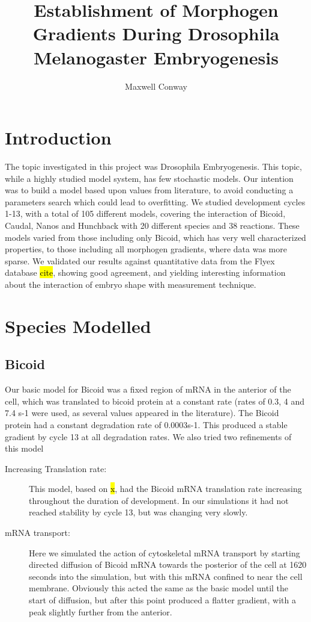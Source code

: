 \documentclass[11pt,a4paper,twocolumn]{article}
\begin{document}
\title{Establishment of Morphogen Gradients During Drosophila Melanogaster Embryogenesis}
\author{Maxwell Conway}
\date{}
\maketitle
\section{Introduction}
The topic investigated in this project was Drosophila Embryogenesis. This topic, while a highly studied model system, has few stochastic models. Our intention was to build a model based upon values from literature, to avoid conducting a parameters search which could lead to overfitting. We studied development cycles 1-13, with a total of 105 different models, covering the interaction of Bicoid, Caudal, Nanos and Hunchback with 20 different species and 38 reactions. These models varied from those including only Bicoid, which has very well characterized properties, to those including all morphogen gradients, where data was more sparse. We validated our results against quantitative data from the Flyex database \hl{cite}, showing good agreement, and yielding interesting information about the interaction of embryo shape with measurement technique. 

\section{Species Modelled}
\subsection{Bicoid}
Our basic model for Bicoid was a fixed region of mRNA in the anterior of the cell, which was translated to bicoid protein at a constant rate (rates of 0.3, 4 and 7.4 s-1 were used, as several values appeared in the literature). The Bicoid protein had a constant degradation rate of 0.0003s-1. This produced a stable gradient by cycle 13 at all degradation rates. We also tried two refinements of this model
\begin{description}
\item[Increasing Translation rate:]
This model, based on \hl{x}, had the Bicoid mRNA translation rate increasing throughout the duration of development. In our simulations it had not reached stability by cycle 13, but was changing very slowly.
\item[mRNA transport:]
Here we simulated the action of cytoskeletal mRNA transport by starting directed diffusion of Bicoid mRNA towards the posterior of the cell at 1620 seconds into the simulation, but with this mRNA confined to near the cell membrane. Obviously this acted the same as the basic model until the start of diffusion, but after this point produced a flatter gradient, with a peak slightly further from the anterior.
\end{description}
\end{document}
